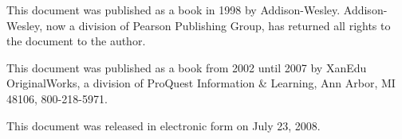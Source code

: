 \documentclass[notitlepage]{article}
\begin{document}
\vspace{2ex}
\noindent
This document was published as a book in 1998 by Addison-Wesley.
Addison-Wesley, now a division of Pearson Publishing Group, has returned all
rights to the document to the author.

\vspace{2ex}
\noindent
This document was published as a book from 2002 until 2007 by XanEdu
OriginalWorks, a division of ProQuest Information \& Learning, Ann
Arbor, MI 48106, 800-218-5971.

\vspace{2ex}
\noindent
This document was released in electronic form on July 23, 2008.
\end{document}
